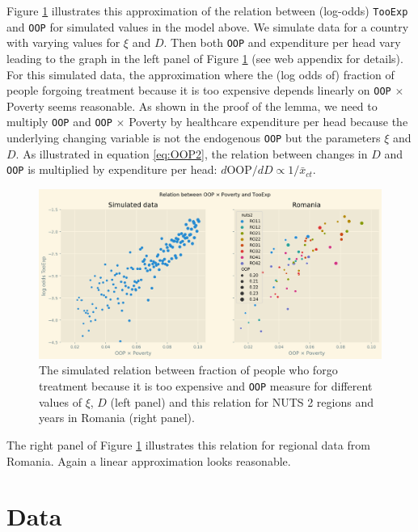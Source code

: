\documentclass[a4paper,12pt]{article}
\begin{document}
Figure \ref{fig:Parametric} illustrates this approximation of the relation between (log-odds) \texttt{TooExp} and \texttt{OOP} for simulated values in the model above. We simulate data for a country with varying values for \(\xi\) and \(D\). Then both \texttt{OOP} and expenditure per head vary leading to the graph in the left panel of Figure \ref{fig:Parametric} (see web appendix for details). For this simulated data, the approximation where the (log odds of) fraction of people forgoing treatment because it is too expensive depends linearly on \texttt{OOP} \(\times\) Poverty seems reasonable. As shown in the proof of the lemma, we need to multiply \texttt{OOP} and \texttt{OOP} \(\times\) Poverty by healthcare expenditure per head because the underlying changing variable is not the endogenous \texttt{OOP} but the parameters \(\xi\) and \(D\). As illustrated in equation \eqref{eq:OOP2}, the relation between changes in \(D\) and \texttt{OOP} is multiplied by expenditure per head: \(d \text{OOP}/d D \propto 1/\bar{x}_{ct}\).

\begin{figure}[htbp]
\centering
\includegraphics[width=.9\linewidth]{./figures/Parametric3.png}
\caption{\label{fig:Parametric}The simulated relation between fraction of people who forgo treatment because it is too expensive and \texttt{OOP} measure for different values of \(\xi\), \(D\) (left panel) and this relation for NUTS 2 regions and years in Romania (right panel).}
\end{figure}

The right panel of Figure \ref{fig:Parametric} illustrates this relation for regional data from Romania. Again a linear approximation looks reasonable.



\section{Data}
\label{sec:orgf5e6555}
\end{document}

